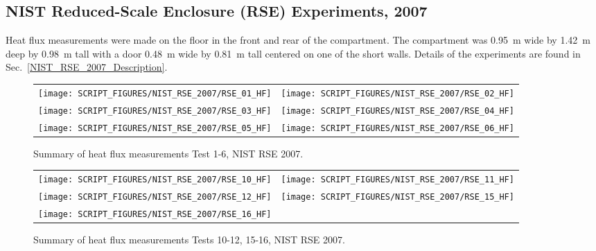 \clearpage

\subsection{NIST Reduced-Scale Enclosure (RSE) Experiments, 2007}

Heat flux measurements were made on the floor in the front and rear of the compartment. The compartment was 0.95~m wide by 1.42~m deep by 0.98~m tall with a door 0.48~m wide by 0.81~m tall centered on one of the short walls.  Details of the experiments are found in Sec.~\ref{NIST_RSE_2007_Description}.

\begin{figure}[!ht]
\begin{tabular*}{\textwidth}{l@{\extracolsep{\fill}}r}
\texttt{[image: SCRIPT\_FIGURES/NIST\_RSE\_2007/RSE\_01\_HF]} &
\texttt{[image: SCRIPT\_FIGURES/NIST\_RSE\_2007/RSE\_02\_HF]} \\
\texttt{[image: SCRIPT\_FIGURES/NIST\_RSE\_2007/RSE\_03\_HF]} &
\texttt{[image: SCRIPT\_FIGURES/NIST\_RSE\_2007/RSE\_04\_HF]} \\
\texttt{[image: SCRIPT\_FIGURES/NIST\_RSE\_2007/RSE\_05\_HF]} &
\texttt{[image: SCRIPT\_FIGURES/NIST\_RSE\_2007/RSE\_06\_HF]}
\end{tabular*}
\caption[Summary of Test 1, NIST RSE 2007]{Summary of heat flux measurements Test 1-6, NIST RSE 2007.}
\label{NIST_RSE_2007_HF_1}
\end{figure}

\newpage

\begin{figure}[p]
\begin{tabular*}{\textwidth}{l@{\extracolsep{\fill}}r}
\texttt{[image: SCRIPT\_FIGURES/NIST\_RSE\_2007/RSE\_10\_HF]} &
\texttt{[image: SCRIPT\_FIGURES/NIST\_RSE\_2007/RSE\_11\_HF]} \\
\texttt{[image: SCRIPT\_FIGURES/NIST\_RSE\_2007/RSE\_12\_HF]} &
\texttt{[image: SCRIPT\_FIGURES/NIST\_RSE\_2007/RSE\_15\_HF]} \\
\texttt{[image: SCRIPT\_FIGURES/NIST\_RSE\_2007/RSE\_16\_HF]} &

\end{tabular*}
\caption[Summary of Test 2, NIST RSE 2007]{Summary of heat flux measurements Tests 10-12, 15-16, NIST RSE 2007.}
\label{NIST_RSE_2007_HF_2}
\end{figure}

